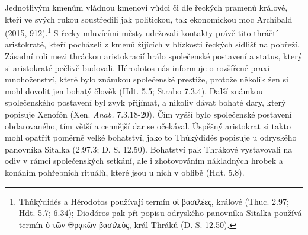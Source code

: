 Jednotlivým kmenům vládnou kmenoví vůdci či dle řeckých pramenů králové, kteří ve svých rukou soustředili jak politickou, tak ekonomickou moc Archibald (2015, 912).\footnote{Thúkýdidés a Hérodotos používají termín οἱ βασιλέες, králové (Thuc. 2.97; Hdt. 5.7; 6.34); Diodóros pak při popisu odryského panovníka Sitalka používá termín ὁ τῶν Θρᾳκῶν βασιλεὺς, král Thráků (D. S. 12.50).} S řecky mluvícími městy udržovali kontakty právě tito thráčtí aristokraté, kteří pocházeli z kmenů žijících v blízkosti řeckých sídlišť na pobřeží. Zásadní roli mezi thráckou aristokracií hrálo společenské postavení a status, který si aristokraté pečlivě budovali. Hérodotos nás informuje o rozšířené praxi mnohoženství, které bylo známkou společenské prestiže, protože několik žen si mohl dovolit jen bohatý člověk (Hdt. 5.5; Strabo 7.3.4). Další známkou společenského postavení byl zvyk přijímat, a nikoliv dávat bohaté dary, který popisuje Xenofón (Xen. {\em Anab.} 7.3.18-20). Čím vyšší bylo společenské postavení obdarovaného, tím větší a cennější dar se očekával. Úspěšný aristokrat si takto mohl opatřit poměrně velké bohatství, jako to Thúkýdidés popisuje u odryského panovníka Sitalka (2.97.3; D. S. 12.50). Bohatství pak Thrákové vystavovali na odiv v rámci společenských setkání, ale i zhotovováním nákladných hrobek a konáním pohřebních rituálů, které jsou u nich v oblibě (Hdt. 5.8).

